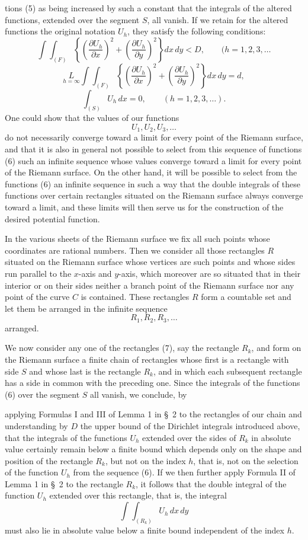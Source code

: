 \documentclass{article}
\begin{document}
tions (5) as being increased by such a constant that the integrals of the altered functions, extended over the segment $S$, all vanish. If we retain for the altered functions the original notation $U_h$, they satisfy the following conditions:
\[
\int\!\!\int_{(F)} \left\{ \left(\frac{\partial U_h}{\partial x}\right)^2 + \left(\frac{\partial U_h}{\partial y}\right)^2 \right\} dx\,dy < D, \qquad (h = 1, 2, 3, \dots
\]
\[
\underset{h=\infty}{L} \int\!\!\int_{(F)} \left\{ \left(\frac{\partial U_h}{\partial x}\right)^2 + \left(\frac{\partial U_h}{\partial y}\right)^2 \right\} dx\,dy = d,
\]
\[
\int_{(S)} U_h\,dx = 0, \qquad (h = 1, 2, 3, \dots).
\]
One could show that the values of our functions
\[
U_1, U_2, U_3, \dots \tag{6}
\]
do not necessarily converge toward a limit for every point of the Riemann surface, and that it is also in general not possible to select from this sequence of functions (6) such an infinite sequence whose values converge toward a limit for every point of the Riemann surface. On the other hand, it will be possible to select from the functions (6) an infinite sequence in such a way that the double integrals of these functions over certain rectangles situated on the Riemann surface always converge toward a limit, and these limits will then serve us for the construction of the desired potential function.

In the various sheets of the Riemann surface we fix all such points whose coordinates are rational numbers. Then we consider all those rectangles $R$ situated on the Riemann surface whose vertices are such points and whose sides run parallel to the $x$-axis and $y$-axis, which moreover are so situated that in their interior or on their sides neither a branch point of the Riemann surface nor any point of the curve $C$ is contained. These rectangles $R$ form a countable set and let them be arranged in the infinite sequence
\[
R_1, R_2, R_3, \dots \tag{7}
\]
arranged.

We now consider any one of the rectangles (7), say the rectangle $R_k$, and form on the Riemann surface a finite chain of rectangles whose first is a rectangle with side $S$ and whose last is the rectangle $R_k$, and in which each subsequent rectangle has a side in common with the preceding one. Since the integrals of the functions (6) over the segment $S$ all vanish, we conclude, by

applying Formulas I and III of Lemma 1 in §~2 to the rectangles of our chain and understanding by $D$ the upper bound of the Dirichlet integrals introduced above, that the integrals of the functions $U_h$ extended over the sides of $R_k$ in absolute value certainly remain below a finite bound which depends only on the shape and position of the rectangle $R_k$, but not on the index $h$, that is, not on the selection of the function $U_h$ from the sequence (6). If we then further apply Formula II of Lemma 1 in §~2 to the rectangle $R_k$, it follows that the double integral of the function $U_h$ extended over this rectangle, that is, the integral
\[
\int\!\!\int_{(R_k)} U_h\,dx\,dy
\]
must also lie in absolute value below a finite bound independent of the index $h$.
\end{document}
